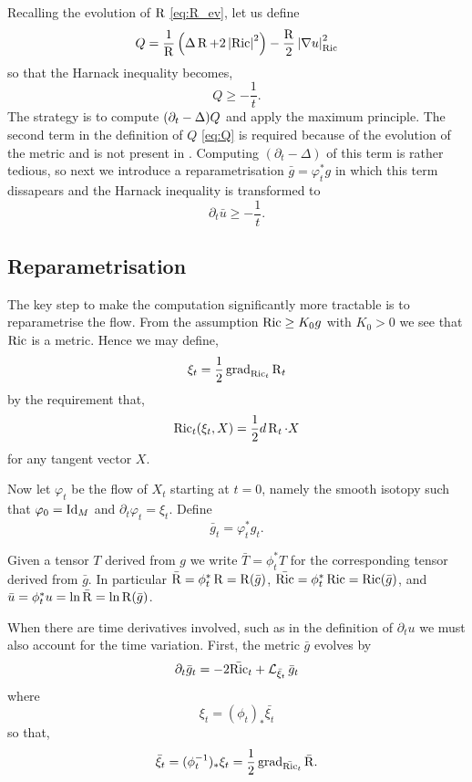 \documentclass{amsart}
\begin{document}
Recalling the evolution of \(\operatorname{R}\) \eqref{eq:R_ev}, let us define
\begin{equation}
\label{eq:Q}
Q = \frac{1}{\operatorname{R}} \left(\operatorname{\Delta} \operatorname{R} + 2\left|{\operatorname{Ric}}\right|^2\right) - \frac{\operatorname{R}}{2} \left|{\nabla u}\right|_{\operatorname{Ric}}^2
\end{equation}
so that the Harnack inequality becomes,
\[
Q \geq - \frac{1}{t}.
\]
The strategy is to compute \((\partial_t - \operatorname{\Delta}) Q\) and apply the maximum principle. The second term in the definition of \(Q\) \eqref{eq:Q} is required because of the evolution of the metric and is not present in \cite{LiYau:/1986}. Computing \((\partial_t - \Delta)\) of this term is rather tedious, so next we introduce a reparametrisation \(\bar{g} = \varphi_t^{\ast} g\) in which this term dissapears and the Harnack inequality is transformed to
\[
\partial_t \bar{u} \geq - \frac{1}{t}.
\]

\subsection{Reparametrisation}
\label{subsec:harnack_reparam}

The key step to make the computation significantly more tractable is to reparametrise the flow. From the assumption \(\operatorname{Ric} \geq K_0 g\) with \(K_0 > 0\) we see that \(\operatorname{Ric}\) is a metric. Hence we may define,
\[
\xi_t = \frac{1}{2} \operatorname{grad}_{\operatorname{Ric}_t} \operatorname{R}_t
\]
by the requirement that,
\[
\operatorname{Ric}_t (\xi_t, X) = \frac{1}{2} d\operatorname{R}_t \cdot X
\]
for any tangent vector \(X\).

Now let \(\varphi_t\) be the flow of \(X_t\) starting at \(t = 0\), namely the smooth isotopy such that \(\varphi_0 = \operatorname{Id}_M\) and \(\partial_t \varphi_t = \xi_t\). Define
\[
\bar{g}_t = \varphi_t^{\ast} g_t.
\]

Given a tensor \(T\) derived from \(g\) we write \(\bar{T} = \phi_t^{\ast} T\) for the corresponding tensor derived from \(\bar{g}\). In particular \(\bar{\operatorname{R}} = \phi_t^{\ast} \operatorname{R} = \operatorname{R}(\bar{g})\), \(\bar{\operatorname{Ric}} = \phi_t^{\ast} \operatorname{Ric} = \operatorname{Ric}(\bar{g})\), and \(\bar{u} = \phi_t^{\ast} u = \ln \bar{\operatorname{R}} = \ln \operatorname{R}(\bar{g})\).

When there are time derivatives involved, such as in the definition of \(\partial_t u\) we must also account for the time variation. First, the metric \(\bar{g}\) evolves by
\begin{equation}
\label{eq:rf_reparam}
\partial_t \bar{g}_t = - 2\bar{\operatorname{Ric}}_t + \operatorname{\mathcal{L}}_{\bar{\xi}_t} \bar{g}_t
\end{equation}
where
\[
\xi_t = (\phi_t)_{\ast} \bar{\xi_t}
\]
so that,
\[
\bar{\xi}_t = (\phi_t^{-1})_{\ast} \xi_t = \frac{1}{2} \operatorname{grad}_{\bar{\operatorname{Ric}}_t} \bar{\operatorname{R}}.
\]
\end{document}
